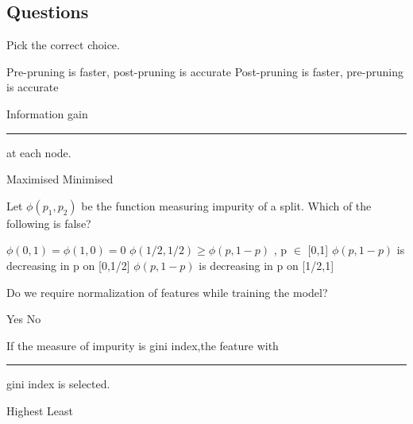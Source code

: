 \documentclass[12pt,letterpaper, onecolumn]{exam}
\begin{document}
\subsection*{Questions}

\begin{questions}
\question[] Pick the correct choice.
\begin{choices}
    \choice Pre-pruning is faster, post-pruning is accurate
    \choice Post-pruning is faster, pre-pruning is accurate
  \end{choices} 
  \question[] Information gain \rule{2cm}{0.15mm} at each node.
  \begin{choices}
    \choice Maximised
    \choice Minimised
  \end{choices} 
 \question[]Let $\phi(p_1,p_2)$ be the function measuring impurity of a split. Which of the following is false?
   \begin{choices}
    \choice $\phi(0,1)=\phi(1,0) = 0$
    \choice $\phi(1/2,1/2) \geq \phi(p,1-p)$ , p $\in$ [0,1]
    \choice $\phi(p,1-p)$  is decreasing in p on [0,1/2]
    \choice $\phi(p,1-p)$  is decreasing in p on [1/2,1]
  \end{choices} 
  \question[] Do we require normalization of features while training the model?\\
  \begin{oneparchoices}
    \choice Yes
    \choice No
  \end{oneparchoices}
  \question[] If the measure of impurity is gini index,the feature with \rule{2cm}{0.15mm} gini index is selected.\\
  \begin{oneparchoices}
    \choice Highest
    \choice Least
  \end{oneparchoices}
  
\end{questions}
\end{document}
